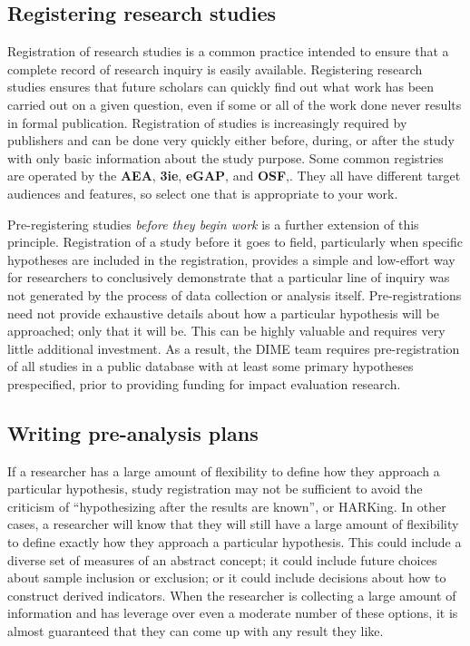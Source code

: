 \subsection{Registering research studies}

Registration of research studies is a common practice
intended to ensure that a complete record of research inquiry is easily available.
Registering research studies ensures that future scholars can quickly
find out what work has been carried out on a given question,
even if some or all of the work done never results in formal publication.
Registration of studies is increasingly required by publishers
and can be done very quickly either before, during, or after the study
with only basic information about the study purpose.
Some common registries are operated by the \textbf{AEA},
\textbf{3ie},
\textbf{eGAP},
and \textbf{OSF},.
They all have different target audiences and features,
so select one that is appropriate to your work.

Pre-registering studies \textit{before they begin work} is a further extension of this principle.\cite{nosek2018preregistration}
Registration of a study before it goes to field,
particularly when specific hypotheses are included in the registration,
provides a simple and low-effort way for researchers
to conclusively demonstrate that a particular line of inquiry
was not generated by the process of data collection or analysis itself.
Pre-registrations need not provide exhaustive details about how
a particular hypothesis will be approached; only that it will be.
This can be highly valuable and requires very little additional investment.
As a result, the DIME team requires pre-registration of all studies
in a public database with at least some primary hypotheses prespecified,
prior to providing funding for impact evaluation research.

\subsection{Writing pre-analysis plans}

If a researcher has a large amount of flexibility
to define how they approach a particular hypothesis,
study registration may not be sufficient to avoid the criticism of
``hypothesizing after the results are known'', or HARKing.\cite{kerr1998harking}
In other cases, a researcher will know that they will still have
a large amount of flexibility to define exactly how they approach a particular hypothesis.
This could include a diverse set of measures of an abstract concept;
it could include future choices about sample inclusion or exclusion;
or it could include decisions about how to construct derived indicators.
When the researcher is collecting a large amount of information
and has leverage over even a moderate number of these options,
it is almost guaranteed that they can come up with any result they like.\cite{gelman2013garden}

